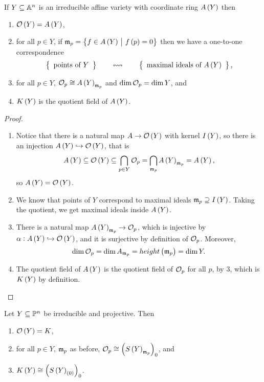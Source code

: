 \begin{theorem}
If $ Y \subseteq \AA^n $ is an irreducible affine variety with coordinate ring $ A\br{Y} $ then
\begin{enumerate}
\item $ \OOO\br{Y} = A\br{Y} $,
\item for all $ p \in Y $, if $ \mmm_p = \cbr{f \in A\br{Y} \st f\br{p} = 0} $ then we have a one-to-one correspondence
$$ \correspondence{\text{points of} \ Y}{\text{maximal ideals of} \ A\br{Y}}, $$
\item for all $ p \in Y $, $ \OOO_p \cong A\br{Y}_{\mmm_p} $ and $ \dim \OOO_p = \dim Y $, and
\item $ K\br{Y} $ is the quotient field of $ A\br{Y} $.
\end{enumerate}
\end{theorem}

\begin{proof}
\hfill
\begin{enumerate}
\item Notice that there is a natural map $ A \to \OOO\br{Y} $ with kernel $ I\br{Y} $, so there is an injection $ A\br{Y} \hookrightarrow \OOO\br{Y} $, that is
$$ A\br{Y} \subseteq \OOO\br{Y} \subseteq \bigcap_{p \in Y} \OOO_p = \bigcap_{\mmm_p} A\br{Y}_{\mmm_p} = A\br{Y}, $$
so $ A\br{Y} = \OOO\br{Y} $.
\item We know that points of $ Y $ correspond to maximal ideals $ \mmm_p \supseteq I\br{Y} $. Taking the quotient, we get maximal ideals inside $ A\br{Y} $.
\item There is a natural map $ A\br{Y}_{\mmm_p} \to \OOO_p $, which is injective by $ \alpha : A\br{Y} \hookrightarrow \OOO\br{Y} $, and it is surjective by definition of $ \OOO_p $. Moreover,
$$ \dim \OOO_p = \dim A_{\mmm_p} = height\br{\mmm_p} = \dim Y. $$
\item The quotient field of $ A\br{Y} $ is the quotient field of $ \OOO_p $ for all $ p $, by $ 3 $, which is $ K\br{Y} $ by definition.
\end{enumerate}
\end{proof}

\begin{theorem}
Let $ Y \subseteq \PP^n $ be irreducible and projective. Then
\begin{enumerate}
\item $ \OOO\br{Y} = K $,
\item for all $ p \in Y $, $ \mmm_p $ as before, $ \OOO_p \cong \br{S\br{Y}_{\mmm_p}}_0 $, and
\item $ K\br{Y} \cong \br{S\br{Y}_{\br{0}}}_0 $.
\end{enumerate}
\end{theorem}

